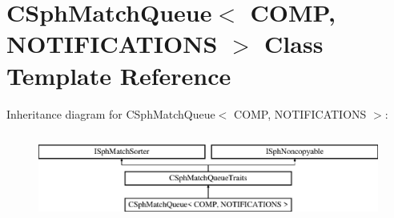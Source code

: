 \hypertarget{classCSphMatchQueue}{\section{C\-Sph\-Match\-Queue$<$ C\-O\-M\-P, N\-O\-T\-I\-F\-I\-C\-A\-T\-I\-O\-N\-S $>$ Class Template Reference}
\label{classCSphMatchQueue}
}
Inheritance diagram for C\-Sph\-Match\-Queue$<$ C\-O\-M\-P, N\-O\-T\-I\-F\-I\-C\-A\-T\-I\-O\-N\-S $>$\-:\begin{figure}[H]
\begin{center}
\leavevmode
\includegraphics[height=2.896552cm]{classCSphMatchQueue}
\end{center}
\end{figure}
